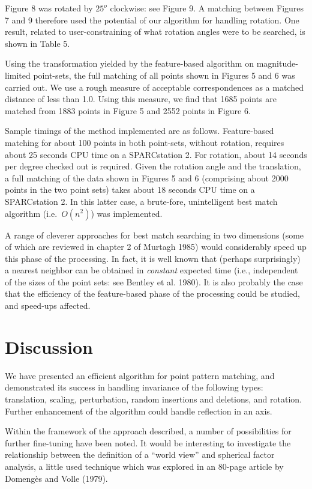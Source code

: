 Figure 8 was rotated by $25^o$ clockwise: see Figure 9.  
A matching between Figures 7 
and 9 therefore used the potential of our algorithm for handling rotation.
One result, related to user-constraining of what rotation angles were to 
be searched, is shown in Table 5.

Using the transformation yielded by the feature-based 
algorithm on magn\-itude-limited 
point-sets, the full matching of all points shown in Figures 5 and 6 was 
carried out.  We use a rough measure of acceptable correspondences as a 
matched distance of less than 1.0.  Using this measure, we find that
1685 points are matched from 1883 points in Figure 5 and 2552 points in Figure 6.

Sample timings of the method implemented are as follows.  Feature-based 
matching for about 100 points in both point-sets, without rotation, 
requires about 25 seconds CPU time on a SPARCstation 2.  For rotation, about
14 seconds per degree checked out is required.  Given the rotation angle and
the translation, a full matching of the data shown in Figures 
5 and 6 (comprising
about 2000 points in the two point sets) takes about 18 seconds CPU time on
a SPARCstation 2.  In this latter case, a brute-fore, unintelligent
best match algorithm (i.e.\ $O(n^2)$) was 
implemented.  

A range of cleverer approaches for
best match searching in two dimensions (some of which are reviewed in chapter
2 of Murtagh 1985) would considerably speed up this phase of the processing.
In fact, it is well known that (perhaps surprisingly) a nearest neighbor 
can be obtained in {\it constant} expected time (i.e., independent of the
sizes of the point sets: see Bentley et al. 1980).
It is also probably the case that the efficiency of the 
feature-based phase of the
processing could be studied, and speed-ups affected.

\section{Discussion}

We have presented an efficient algorithm for point pattern matching,
and demonstrated its success in handling invariance of the following types:
translation, scaling, perturbation, random insertions and deletions, and 
rotation.  Further enhancement of the algorithm could handle 
reflection in an axis.

Within the framework of the approach described, a number of  
possibilities for further fine-tuning have been noted.  It would be
interesting to investigate the relationship between the definition
of a ``world view'' and 
spherical factor analysis, a little used technique which was
explored in an 80-page article by Domeng\`es and Volle (1979).  

